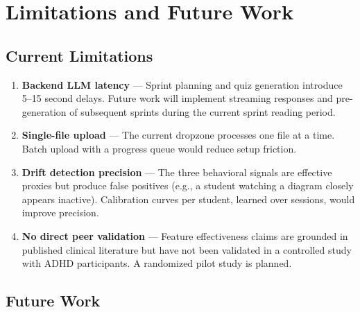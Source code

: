 \documentclass[conference]{IEEEtran}
\begin{document}
\section{Limitations and Future Work}

\subsection{Current Limitations}

\begin{enumerate}
  \item \textbf{Backend LLM latency} — Sprint planning and quiz generation introduce 5--15 second delays. Future work will implement streaming responses and pre-generation of subsequent sprints during the current sprint reading period.

  \item \textbf{Single-file upload} — The current dropzone processes one file at a time. Batch upload with a progress queue would reduce setup friction.

  \item \textbf{Drift detection precision} — The three behavioral signals are effective proxies but produce false positives (e.g., a student watching a diagram closely appears inactive). Calibration curves per student, learned over sessions, would improve precision.

  \item \textbf{No direct peer validation} — Feature effectiveness claims are grounded in published clinical literature but have not been validated in a controlled study with ADHD participants. A randomized pilot study is planned.
\end{enumerate}

\subsection{Future Work}
\end{document}
